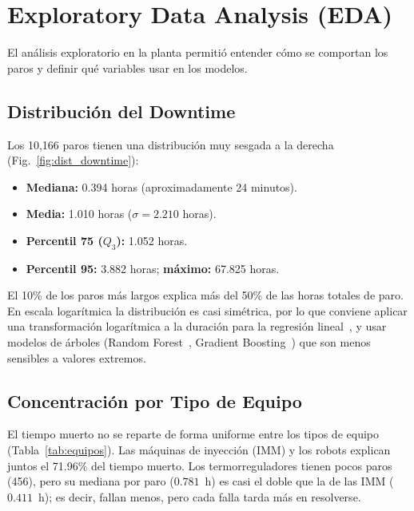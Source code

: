 \documentclass[conference]{IEEEtran}
\begin{document}
\section{Exploratory Data Analysis (EDA)}
El análisis exploratorio en la planta permitió entender cómo se comportan los paros y definir qué variables usar en los modelos.

\subsection{Distribución del Downtime}
Los 10,166 paros tienen una distribución muy sesgada a la derecha (Fig.~\ref{fig:dist_downtime}):
\begin{itemize}
    \item \textbf{Mediana:} 0.394 horas (aproximadamente 24 minutos).
    \item \textbf{Media:} 1.010 horas ($\sigma = 2.210$ horas).
    \item \textbf{Percentil 75 ($Q_3$):} 1.052 horas.
    \item \textbf{Percentil 95:} 3.882 horas; \textbf{máximo:} 67.825 horas.
\end{itemize}
El 10\% de los paros más largos explica más del 50\% de las horas totales de paro. En escala logarítmica la distribución es casi simétrica, por lo que conviene aplicar una transformación logarítmica a la duración para la regresión lineal~\cite{hastie2009}, y usar modelos de árboles (Random Forest~\cite{breiman2001}, Gradient Boosting~\cite{friedman2001}) que son menos sensibles a valores extremos.

\subsection{Concentración por Tipo de Equipo}
El tiempo muerto no se reparte de forma uniforme entre los tipos de equipo (Tabla~\ref{tab:equipos}). Las máquinas de inyección (IMM) y los robots explican juntos el 71.96\% del tiempo muerto. Los termorreguladores tienen pocos paros (456), pero su mediana por paro ($0.781$~h) es casi el doble que la de las IMM ($0.411$~h); es decir, fallan menos, pero cada falla tarda más en resolverse.
\end{document}
